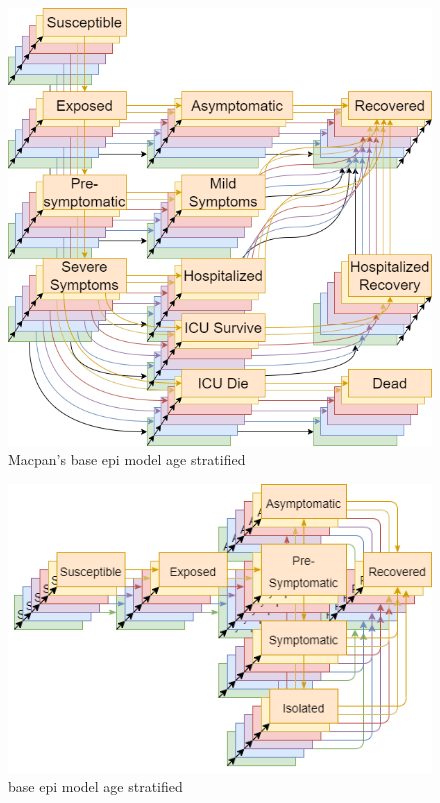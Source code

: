 \begin{appendices}
\begin{figure}
    \centering
    \includegraphics[width=\textwidth]{images/macpan_base_w_age.png}
    \caption{Macpan's base epi model age stratified}
    \label{fig:ageified_macpan_epi}
\end{figure}

\begin{figure}
    \centering
    \includegraphics[width=\textwidth]{images/fieldshumphery_age.png}
    \caption{\cite{fields2021age} base epi model age stratified}
    \label{fig:ageified_fh_epi}
\end{figure}

\FloatBarrier

\end{appendices}
